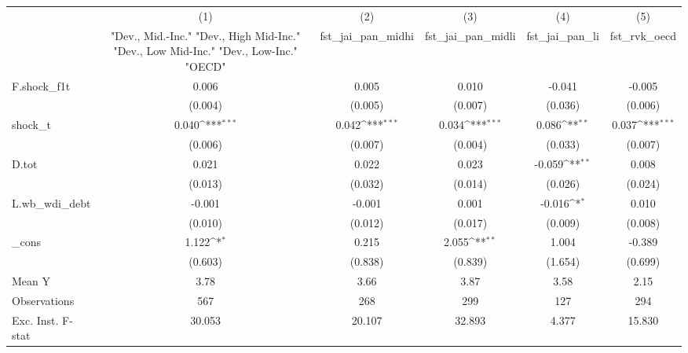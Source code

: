{
\def\sym#1{\ifmmode^{#1}\else\(^{#1}\)\fi}
\begin{tabular}{l*{5}{c}}
\toprule
            &\multicolumn{1}{c}{(1)}&\multicolumn{1}{c}{(2)}&\multicolumn{1}{c}{(3)}&\multicolumn{1}{c}{(4)}&\multicolumn{1}{c}{(5)}\\
            &\multicolumn{1}{c}{ "Dev., Mid.-Inc." "Dev., High Mid-Inc." "Dev., Low Mid-Inc." "Dev., Low-Inc." "OECD" }&\multicolumn{1}{c}{fst\_jai\_pan\_midhi}&\multicolumn{1}{c}{fst\_jai\_pan\_midli}&\multicolumn{1}{c}{fst\_jai\_pan\_li}&\multicolumn{1}{c}{fst\_rvk\_oecd}\\
\midrule
F.shock\_f1t &       0.006         &       0.005         &       0.010         &      -0.041         &      -0.005         \\
            &     (0.004)         &     (0.005)         &     (0.007)         &     (0.036)         &     (0.006)         \\
\addlinespace
shock\_t     &       0.040\sym{***}&       0.042\sym{***}&       0.034\sym{***}&       0.086\sym{**} &       0.037\sym{***}\\
            &     (0.006)         &     (0.007)         &     (0.004)         &     (0.033)         &     (0.007)         \\
\addlinespace
D.tot       &       0.021         &       0.022         &       0.023         &      -0.059\sym{**} &       0.008         \\
            &     (0.013)         &     (0.032)         &     (0.014)         &     (0.026)         &     (0.024)         \\
\addlinespace
L.wb\_wdi\_debt&      -0.001         &      -0.001         &       0.001         &      -0.016\sym{*}  &       0.010         \\
            &     (0.010)         &     (0.012)         &     (0.017)         &     (0.009)         &     (0.008)         \\
\addlinespace
\_cons      &       1.122\sym{*}  &       0.215         &       2.055\sym{**} &       1.004         &      -0.389         \\
            &     (0.603)         &     (0.838)         &     (0.839)         &     (1.654)         &     (0.699)         \\
\midrule
Mean Y      &        3.78         &        3.66         &        3.87         &        3.58         &        2.15         \\
Observations&         567         &         268         &         299         &         127         &         294         \\
Exc. Inst. F-stat&      30.053         &      20.107         &      32.893         &       4.377         &      15.830         \\
\bottomrule
\end{tabular}
}
